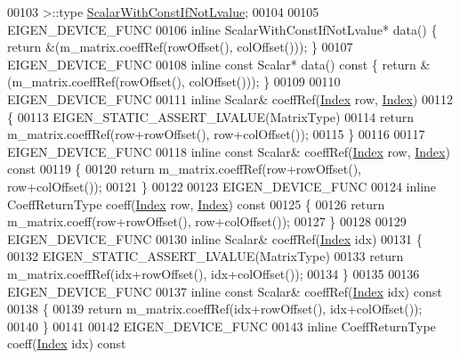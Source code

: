 \begin{DoxyCode}
00103                      >::type \hyperlink{class_eigen_1_1internal_1_1_tensor_lazy_evaluator_writable}{ScalarWithConstIfNotLvalue};
00104 
00105     EIGEN\_DEVICE\_FUNC
00106     \textcolor{keyword}{inline} ScalarWithConstIfNotLvalue* data() \{ \textcolor{keywordflow}{return} &(m\_matrix.coeffRef(rowOffset(), colOffset())); \}
00107     EIGEN\_DEVICE\_FUNC
00108     \textcolor{keyword}{inline} \textcolor{keyword}{const} Scalar* data()\textcolor{keyword}{ const }\{ \textcolor{keywordflow}{return} &(m\_matrix.coeffRef(rowOffset(), colOffset())); \}
00109 
00110     EIGEN\_DEVICE\_FUNC
00111     \textcolor{keyword}{inline} Scalar& coeffRef(\hyperlink{namespace_eigen_a62e77e0933482dafde8fe197d9a2cfde}{Index} row, \hyperlink{namespace_eigen_a62e77e0933482dafde8fe197d9a2cfde}{Index})
00112     \{
00113       EIGEN\_STATIC\_ASSERT\_LVALUE(MatrixType)
00114       \textcolor{keywordflow}{return} m\_matrix.coeffRef(row+rowOffset(), row+colOffset());
00115     \}
00116 
00117     EIGEN\_DEVICE\_FUNC
00118     \textcolor{keyword}{inline} \textcolor{keyword}{const} Scalar& coeffRef(\hyperlink{namespace_eigen_a62e77e0933482dafde8fe197d9a2cfde}{Index} row, \hyperlink{namespace_eigen_a62e77e0933482dafde8fe197d9a2cfde}{Index})\textcolor{keyword}{ const}
00119 \textcolor{keyword}{    }\{
00120       \textcolor{keywordflow}{return} m\_matrix.coeffRef(row+rowOffset(), row+colOffset());
00121     \}
00122 
00123     EIGEN\_DEVICE\_FUNC
00124     \textcolor{keyword}{inline} CoeffReturnType coeff(\hyperlink{namespace_eigen_a62e77e0933482dafde8fe197d9a2cfde}{Index} row, \hyperlink{namespace_eigen_a62e77e0933482dafde8fe197d9a2cfde}{Index})\textcolor{keyword}{ const}
00125 \textcolor{keyword}{    }\{
00126       \textcolor{keywordflow}{return} m\_matrix.coeff(row+rowOffset(), row+colOffset());
00127     \}
00128 
00129     EIGEN\_DEVICE\_FUNC
00130     \textcolor{keyword}{inline} Scalar& coeffRef(\hyperlink{namespace_eigen_a62e77e0933482dafde8fe197d9a2cfde}{Index} idx)
00131     \{
00132       EIGEN\_STATIC\_ASSERT\_LVALUE(MatrixType)
00133       \textcolor{keywordflow}{return} m\_matrix.coeffRef(idx+rowOffset(), idx+colOffset());
00134     \}
00135 
00136     EIGEN\_DEVICE\_FUNC
00137     \textcolor{keyword}{inline} \textcolor{keyword}{const} Scalar& coeffRef(\hyperlink{namespace_eigen_a62e77e0933482dafde8fe197d9a2cfde}{Index} idx)\textcolor{keyword}{ const}
00138 \textcolor{keyword}{    }\{
00139       \textcolor{keywordflow}{return} m\_matrix.coeffRef(idx+rowOffset(), idx+colOffset());
00140     \}
00141 
00142     EIGEN\_DEVICE\_FUNC
00143     \textcolor{keyword}{inline} CoeffReturnType coeff(\hyperlink{namespace_eigen_a62e77e0933482dafde8fe197d9a2cfde}{Index} idx)\textcolor{keyword}{ const}

\end{DoxyCode}
